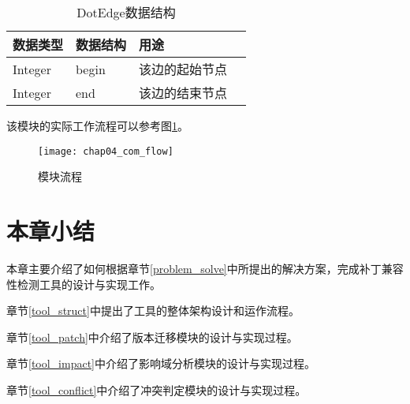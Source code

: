 \begin{table}[H]
	\caption{DotEdge数据结构}
	\label{edge_data}
	\centering
	\begin{tabular}{lllc}
		\toprule[1.5pt]
		{\heiti 数据类型} &{\heiti 数据结构} & {\heiti 用途} \\\midrule[1pt]
		Integer   & begin & 该边的起始节点 \\
		Integer  &   end & 该边的结束节点 \\
		\bottomrule[1.5pt] 
	\end{tabular}
\end{table}

该模块的实际工作流程可以参考图\ref {com_flow}。

\begin{figure}[H]
	\centering
	\texttt{[image: chap04\_com\_flow]}
	\caption {模块流程}
	\label {com_flow}	
\end{figure}


\section{本章小结}
本章主要介绍了如何根据章节\ref {problem_solve}中所提出的解决方案，完成补丁兼容性检测工具的设计与实现工作。

章节\ref {tool_struct}中提出了工具的整体架构设计和运作流程。

章节\ref {tool_patch}中介绍了版本迁移模块的设计与实现过程。

章节\ref {tool_impact}中介绍了影响域分析模块的设计与实现过程。

章节\ref {tool_conflict}中介绍了冲突判定模块的设计与实现过程。